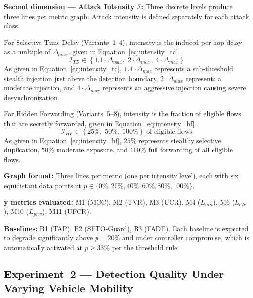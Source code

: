\documentclass[12pt, a4paper]{report}
\begin{document}
{{\textbf{Second dimension — Attack Intensity $\mathcal{I}$:}
Three discrete levels produce three lines per metric
graph. Attack intensity is defined separately for each
attack class.

For Selective Time Delay (Variants~1--4), intensity is
the induced per-hop delay as a multiple of $\Delta_{max}$,
given in Equation~\eqref{eq:intensity_td}.
\begin{equation}
\mathcal{I}_{TD} \in
\left\{
1.1\cdot\Delta_{max},\;
2\cdot\Delta_{max},\;
4\cdot\Delta_{max}
\right\}
\label{eq:intensity_td}
\end{equation}
As given in Equation~\eqref{eq:intensity_td},
$1.1\cdot\Delta_{max}$ represents a sub-threshold
stealth injection just above the detection boundary,
$2\cdot\Delta_{max}$ represents a moderate injection,
and $4\cdot\Delta_{max}$ represents an aggressive
injection causing severe desynchronization.

For Hidden Forwarding (Variants~5--8), intensity is
the fraction of eligible flows that are secretly
forwarded, given in Equation~\eqref{eq:intensity_hf}.
\begin{equation}
\mathcal{I}_{HF} \in
\left\{25\%,\; 50\%,\; 100\%\right\}
\;\text{of eligible flows}
\label{eq:intensity_hf}
\end{equation}
As given in Equation~\eqref{eq:intensity_hf},
$25\%$ represents stealthy selective duplication,
$50\%$ moderate exposure, and $100\%$ full
forwarding of all eligible flows.

\textbf{Graph format:} Three lines per metric (one
per intensity level), each with six equidistant
data points at $p \in \{0\%, 20\%, 40\%, 60\%,
80\%, 100\%\}$.

\textbf{y metrics evaluated:}
M1 (MCC), M2 (TVR), M3 (UCR), M4 ($L_{mit}$),
M6 ($L_{e2e}$), M10 ($L_{priv}$), M11 (UFCR).

\textbf{Baselines:} B1 (TAP), B2 (SFTO-Guard),
B3 (FADE). Each baseline is expected to degrade
significantly above $p = 20\%$ and under controller
compromise, which is automatically activated at
$p \geq 33\%$ per the threshold rule.



\subsection{Experiment~2 — Detection Quality Under
Varying Vehicle Mobility}
\label{sec:exp2}

}}
\end{document}
